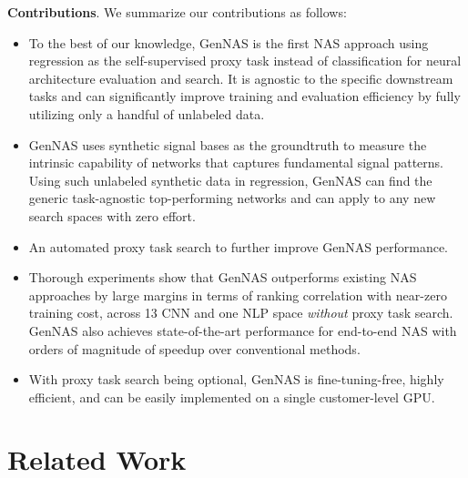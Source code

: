 \documentclass{article}
\begin{document}
\textbf{Contributions}. We summarize our contributions as follows:

\vspace{-5pt}

\begin{itemize}

\item {To the best of our knowledge, GenNAS is the first NAS approach using regression as the self-supervised proxy task instead of classification for neural architecture evaluation and search. It is agnostic to the specific downstream tasks and can significantly improve training and evaluation efficiency by fully utilizing only a handful of unlabeled data.
}

\item{GenNAS uses synthetic signal bases as the groundtruth to measure the intrinsic capability of networks that captures fundamental signal patterns. Using such unlabeled synthetic data in regression, GenNAS can find the generic task-agnostic top-performing networks and can apply to any new search spaces with zero effort.
}

\item {An automated proxy task search to further improve GenNAS performance.}
 
\item {Thorough experiments show that GenNAS outperforms existing NAS approaches by large margins in terms of ranking correlation with near-zero training cost, across 13 CNN and one NLP space \textit{without} proxy task search. GenNAS also achieves state-of-the-art performance for end-to-end NAS with orders of magnitude of speedup over conventional methods.
}
  
\item {With proxy task search being optional, GenNAS is fine-tuning-free, highly efficient, and can be easily implemented on a single customer-level GPU.
}

\end{itemize}

\section{Related Work}
\end{document}
